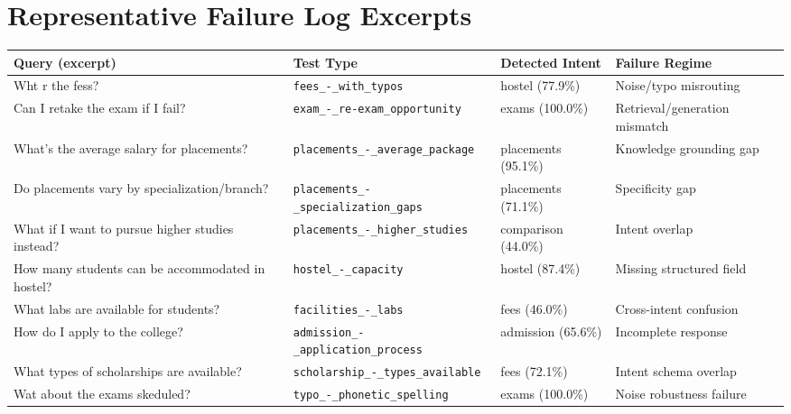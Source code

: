 \documentclass[12pt,onecolumn]{report}
\begin{document}
\section{Representative Failure Log Excerpts}
\centering
\scriptsize
\setlength{\tabcolsep}{3pt}
\begin{tabular}{p{}p{}p{}p{}}
\toprule

\textbf{Query (excerpt)} & \textbf{Test Type} & \textbf{Detected Intent} & \textbf{Failure Regime}\\

\midrule

Wht r the fess? & \texttt{fees\_-\_with\_typos} & hostel (77.9\%) & Noise/typo misrouting\\

Can I retake the exam if I fail? & \texttt{exam\_-\_re-exam\_opportunity} & exams (100.0\%) & Retrieval/generation mismatch\\

What's the average salary for placements? & \texttt{placements\_-\_average\_package} & placements (95.1\%) & Knowledge grounding gap\\

Do placements vary by specialization/branch? & \texttt{placements\_-\_specialization\_gaps} & placements (71.1\%) & Specificity gap\\

What if I want to pursue higher studies instead? & \texttt{placements\_-\_higher\_studies} & comparison (44.0\%) & Intent overlap\\

How many students can be accommodated in hostel? & \texttt{hostel\_-\_capacity} & hostel (87.4\%) & Missing structured field\\

What labs are available for students? & \texttt{facilities\_-\_labs} & fees (46.0\%) & Cross-intent confusion\\

How do I apply to the college? & \texttt{admission\_-\_application\_process} & admission (65.6\%) & Incomplete response\\

What types of scholarships are available? & \texttt{scholarship\_-\_types\_available} & fees (72.1\%) & Intent schema overlap\\

Wat about the exams skeduled? & \texttt{typo\_-\_phonetic\_spelling} & exams (100.0\%) & Noise robustness failure\\

\bottomrule
\end{tabular}
\label{tab:appendix-failures}
\end{document}
